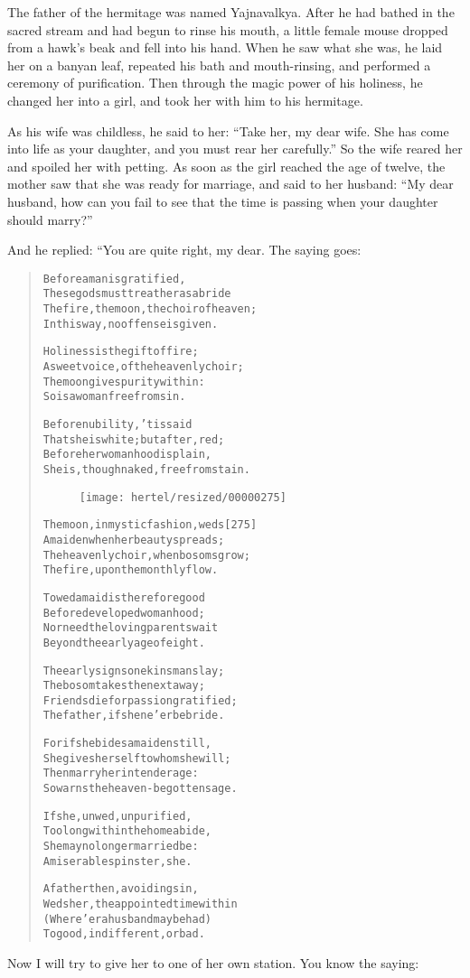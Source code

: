 \documentclass[article, twoside, 10pt]{memoir}
\renewenvironment{verbatim}{%
\begin{quote}%
\vskip -10pt%
\begin{alltt}\normalfont\small}{\end{alltt}%
\end{quote}%
\vskip -10pt
} %
\begin{document}
The father of the hermitage was named Yajnavalkya. After he had
bathed in the sacred stream and had begun to rinse his mouth, a
little female mouse dropped from a hawk's beak and fell into his
hand. When he saw what she was, he laid her on a banyan leaf,
repeated his bath and mouth-rinsing, and performed a ceremony of
purification. Then through the magic power of his holiness, he
changed her into a girl, and took her with him to his hermitage.

As his wife was childless, he said to her:
``Take her, my dear wife. She has come into life as your daughter, and you must rear her carefully.''
So the wife reared her and spoiled her with petting. As soon as the
girl reached the age of twelve, the mother saw that she was ready
for marriage, and said to her husband:
``My dear husband, how can you fail to see that the time is passing when your daughter should marry?''

And he replied: “You are quite right, my dear. The saying goes:

\begin{verbatim}
Before a man is gratified,
These gods must treat her as a bride{\textemdash}
The fire, the moon, the choir of heaven;
In this way, no offense is given.

Holiness is the gift of fire;
A sweet voice, of the heavenly choir;
The moon gives purity within:
So is a woman free from sin.

Before nubility, 'tis said
That she is white; but after, red;
Before her womanhood is plain,
She is, though naked, free from stain.

\begin{figure}[p]\texttt{[image: hertel/resized/00000275]}\end{figure}The moon, in mystic fashion, weds                       [275]
A maiden when her beauty spreads;
The heavenly choir, when bosoms grow;
The fire, upon the monthly flow.

To wed a maid is therefore good
Before developed womanhood;
Nor need the loving parents wait
Beyond the early age of eight.

The early signs one kinsman slay;
The bosom takes the next away;
Friends die for passion gratified;
The father, if she ne'er be bride.

For if she bides a maiden still,
She gives herself to whom she will;
Then marry her in tender age:
So warns the heaven-begotten sage.

If she, unwed, unpurified,
Too long within the home abide,
She may no longer married be:
A miserable spinster, she.

A father then, avoiding sin,
Weds her, the appointed time within
(Where'er a husband may be had)
To good, indifferent, or bad.
\end{verbatim}
Now I will try to give her to one of her own station. You know the
saying:
\end{document}
